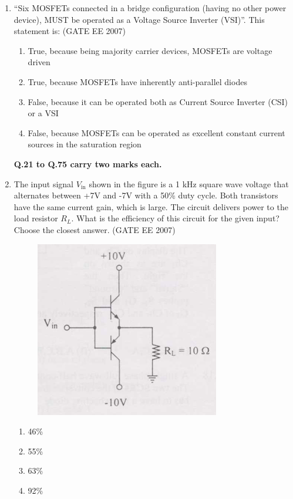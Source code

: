 \documentclass[a4paper,10pt]{exam}
\theoremstyle{remark}
\begin{document}
\begin{enumerate}
\item  ``Six MOSFETs connected in a bridge configuration (having no other power device), MUST be operated as a Voltage Source Inverter (VSI)''. This statement is: \hfill{(GATE EE 2007)} 
\begin{enumerate}
 \item  True, because being majority carrier devices, MOSFETs are voltage driven 
 \item  True, because MOSFETs have inherently anti-parallel diodes
 \item  False, because it can be operated both as Current Source Inverter (CSI) or a VSI 
 \item False, because MOSFETs can be operated as excellent constant current sources in the saturation region 
\end{enumerate}
\textbf{Q.21 to Q.75 carry two marks each.}\\[3ex]

\item  The input signal $V_{\text{in}}$ shown in the figure is a 1 kHz square wave voltage that alternates between +7V and -7V with a 50\% duty cycle. Both transistors have the same current gain, which is large. The circuit delivers power to the load resistor $R_L$. What is the efficiency of this circuit for the given input? Choose the closest answer. \hfill{(GATE EE 2007)} 

\begin{figure}[H]
    \centering
    \includegraphics[width=0.5\linewidth]{figs/Q 21.png} \caption{}     \label{fig:myfigure}
    
\end{figure}

\begin{multicols}{4}
\begin{enumerate}
 \item 46\% 
\item 55\%
\item  63\% 
\item  92\% 
\end{enumerate}
\end{multicols}


\end{enumerate}
\end{document}
